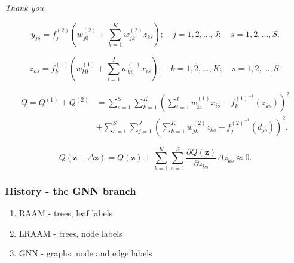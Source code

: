 \documentclass{beamer}
\begin{document}
\begin{frame}
\begin{center}
\Huge{\emph{Thank you}}
\end{center}
\end{frame}

\begin{frame}

\begin{equation}
y_{js} = f^{(2)}_j \left( w^{(2)}_{j0} + \sum_{k=1}^{K} w^{(2)}_{jk} z_{ks}\right); \quad j = 1,2,...,J; \quad s = 1,2,...,S.
\label{eq:threelayer2}
\end{equation}

\begin{equation}
z_{ks} = f^{(1)}_k \left( w^{(1)}_{k0} + \sum_{i=1}^{I}w^{(1)}_{ki}x_{is} \right); \quad k = 1,2,...,K; \quad s = 1,2,...,S.
\label{eq:threelayer1}
\end{equation}

\end{frame}

\begin{frame}

\begin{align*}
Q = Q^{(1)} + Q^{(2)}
&= \sum_{s=1}^{S}\sum_{k=1}^{K} \left( \sum_{i=1}^{I} w^{(1)}_{ki} x_{is} - f^{(1)^{-1}}_k(z_{ks}) \right)^{2}\\
&+ \sum_{s=1}^{S}\sum_{j=1}^{J} \left( \sum_{k=1}^{K} w^{(2)}_{jk} z_{ks} - f^{(2)^{-1}}_j(d_{js}) \right)^{2}.
\label{eq:qall}
\end{align*}

\begin{equation}
Q(\bm{z} + \Delta \bm{z}) = Q(\bm{z}) + \sum_{k=1}^{K}\sum_{s=1}^{S} \frac{\partial Q(\bm{z})}{\partial z_{ks}} \Delta z_{ks} \approx 0.
\label{eq:qdz}
\end{equation}
\end{frame}


\begin{frame}
\frametitle{History - the GNN branch}
\begin{enumerate}
	\item RAAM - trees, leaf labels
	\item LRAAM - trees, node labels
	\item GNN - graphs, node and edge labels
\end{enumerate}
\end{frame}
\end{document}
